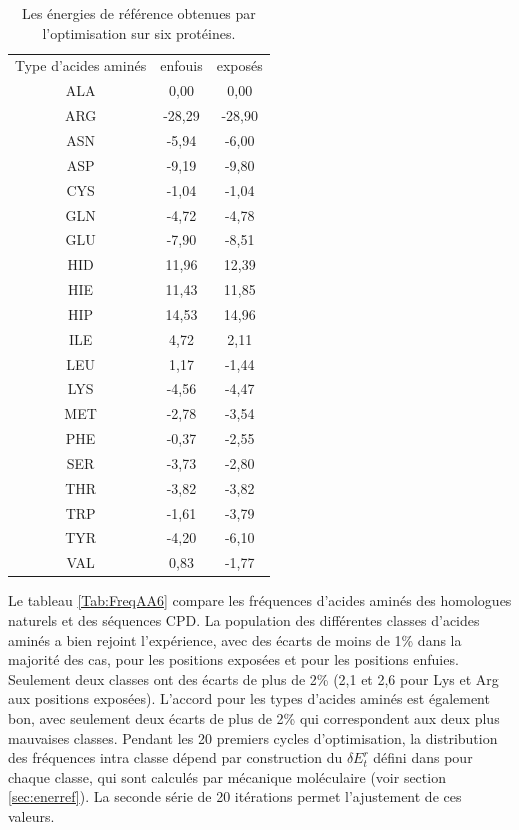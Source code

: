     \begin{table}[!htbp]
      \centering
      \caption{Les énergies de référence obtenues par l'optimisation sur six protéines.}
      \begin{tabular}{ccc}

        \toprule
        Type d'acides aminés & enfouis & exposés \\
        \cmidrule{1-3}

        ALA & 0,00     &  0,00     \\
        ARG & -28,29   &  -28,90   \\
        ASN & -5,94    &  -6,00    \\
        ASP & -9,19    &  -9,80    \\
        CYS & -1,04    &  -1,04    \\
        GLN & -4,72    &  -4,78    \\
        GLU & -7,90    &  -8,51    \\
        HID & 11,96    &  12,39    \\
        HIE & 11,43    &  11,85    \\
        HIP & 14,53    &  14,96    \\
        ILE & 4,72     &  2,11     \\
        LEU & 1,17     &  -1,44    \\
        LYS & -4,56    &  -4,47    \\
        MET & -2,78    &  -3,54    \\
        PHE & -0,37    &  -2,55    \\
        SER & -3,73    &  -2,80    \\
        THR & -3,82    &  -3,82    \\
        TRP & -1,61    &  -3,79    \\
        TYR & -4,20    &  -6,10    \\
        VAL & 0,83     &  -1,77    \\

        \bottomrule
      \end{tabular}      

\label{tab:RefEner6}      
    \end{table}

Le tableau \ref{Tab:FreqAA6} compare les fréquences d'acides aminés des homologues naturels et des séquences CPD. La population des différentes classes d'acides aminés a bien rejoint l'expérience, avec des écarts de moins de 1\% dans la majorité des cas, pour les positions exposées et pour les positions enfuies. Seulement deux classes ont des écarts de plus de 2\% (2,1 et 2,6 pour Lys et Arg aux positions exposées). L'accord pour les types d'acides aminés est également bon, avec seulement deux écarts de plus de 2\% qui correspondent aux deux plus mauvaises classes. Pendant les 20 premiers cycles d'optimisation, la distribution des fréquences intra classe dépend par construction du $\delta E_t^r$ défini dans pour chaque classe, qui sont calculés par mécanique moléculaire (voir section \ref{sec:enerref}). La seconde série de 20 itérations permet l'ajustement de ces valeurs. 
    
